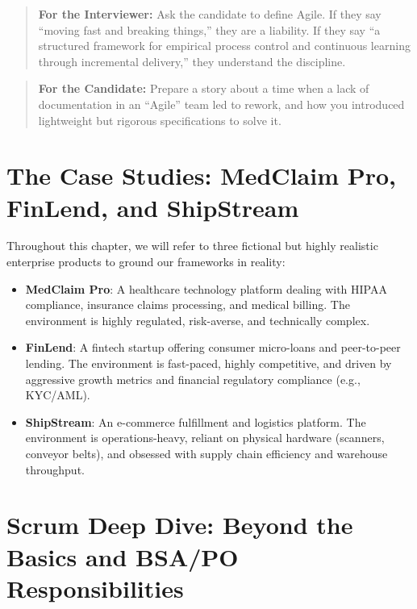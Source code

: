 \begin{quote}
\textbf{For the Interviewer:} Ask the candidate to define Agile. If they
say ``moving fast and breaking things,'' they are a liability. If they
say ``a structured framework for empirical process control and
continuous learning through incremental delivery,'' they understand the
discipline.
\end{quote}

\begin{quote}
\textbf{For the Candidate:} Prepare a story about a time when a lack of
documentation in an ``Agile'' team led to rework, and how you introduced
lightweight but rigorous specifications to solve it.
\end{quote}

\section{The Case Studies: MedClaim Pro, FinLend, and
ShipStream}\label{the-case-studies-medclaim-pro-finlend-and-shipstream}

Throughout this chapter, we will refer to three fictional but highly
realistic enterprise products to ground our frameworks in reality:

\begin{itemize}
\tightlist
\item
  \textbf{MedClaim Pro}: A healthcare technology platform dealing with
  HIPAA compliance, insurance claims processing, and medical billing.
  The environment is highly regulated, risk-averse, and technically
  complex.
\item
  \textbf{FinLend}: A fintech startup offering consumer micro-loans and
  peer-to-peer lending. The environment is fast-paced, highly
  competitive, and driven by aggressive growth metrics and financial
  regulatory compliance (e.g., KYC/AML).
\item
  \textbf{ShipStream}: An e-commerce fulfillment and logistics platform.
  The environment is operations-heavy, reliant on physical hardware
  (scanners, conveyor belts), and obsessed with supply chain efficiency
  and warehouse throughput.
\end{itemize}

\section{Scrum Deep Dive: Beyond the Basics and BSA/PO
Responsibilities}\label{scrum-deep-dive-beyond-the-basics-and-bsapo-responsibilities}

